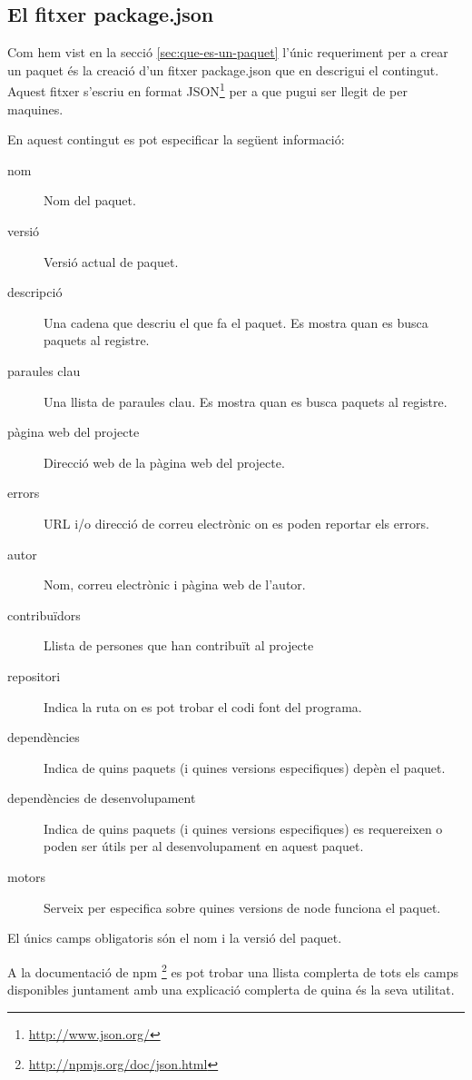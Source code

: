 \subsection{El fitxer package.json}
\label{sec:fitxer-package.json}

Com hem vist en la secció \ref{sec:que-es-un-paquet} l'únic requeriment per a crear un paquet és la creació d'un fitxer package.json que en descrigui el contingut. Aquest fitxer s'escriu en format JSON\footnote{\url{http://www.json.org/}} per a que pugui ser llegit de per maquines. 

En aquest contingut es pot especificar la següent informació: 
\begin{description}
\item[nom] {Nom del paquet.}
\item[versió] {Versió actual de paquet.}
\item[descripció] {Una cadena que descriu el que fa el paquet. Es mostra quan es busca paquets al registre.}
\item[paraules clau] {Una llista de paraules clau. Es mostra quan es busca paquets al registre.}
\item[pàgina web del projecte] {Direcció web de la pàgina web del projecte.}
\item[errors] { URL i/o direcció de correu electrònic on es poden reportar els errors. }
\item[autor] {Nom, correu electrònic i pàgina web de l'autor.}
\item[contribuïdors] { Llista de persones que han contribuït al projecte}
\item[repositori] { Indica la ruta on es pot trobar el codi font del programa. }
\item[dependències] { Indica de quins paquets (i quines versions especifiques) depèn el paquet.}
\item[dependències de desenvolupament] { Indica de quins paquets (i quines versions especifiques) es requereixen o poden ser útils per al desenvolupament en aquest paquet.}
\item[motors] {Serveix per especifica sobre quines versions de node funciona el paquet.}

\end{description}

El únics camps obligatoris són el nom i la versió del paquet. 

A la documentació de npm \footnote{\url{http://npmjs.org/doc/json.html}} es pot trobar una llista complerta de tots els camps disponibles juntament amb una explicació complerta de quina és la seva utilitat. 

